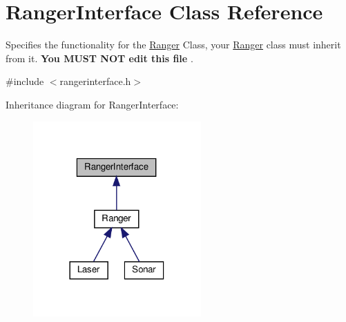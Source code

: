\hypertarget{classRangerInterface}{}\section{Ranger\+Interface Class Reference}
\label{classRangerInterface}


Specifies the functionality for the \hyperlink{classRanger}{Ranger} Class, your \hyperlink{classRanger}{Ranger} class must inherit from it. {\bfseries  You M\+U\+ST N\+OT edit this file }.  




{\ttfamily \#include $<$rangerinterface.\+h$>$}



Inheritance diagram for Ranger\+Interface\+:\nopagebreak
\begin{figure}[H]
\begin{center}
\leavevmode
\includegraphics[width=182pt]{classRangerInterface__inherit__graph}
\end{center}
\end{figure}
